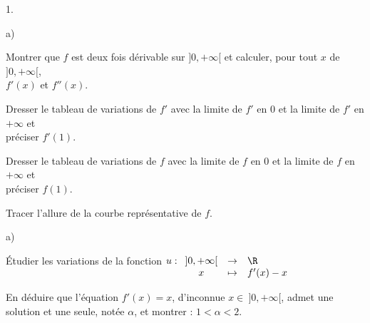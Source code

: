 \begin{noliste}{1.}
  \setlength{\itemsep}{2mm}
\item 
  \begin{noliste}{a)}
  \item Montrer que $f$ est deux fois dérivable sur $]0,+\infty[$ et
    calculer, pour tout $x$ de $]0,+\infty[$,\\
    $f'(x)$ et $f''(x)$.
    
    	
    
  \item Dresser le tableau de variations de $f'$ avec la limite de
    $f'$ en $0$ et la limite de $f'$ en $+\infty$ et \\ préciser
    $f'(1)$.
    
    
  \end{noliste}
  
  
  

\item Dresser le tableau de variations de $f$ avec la limite de $f$ en
  $0$ et la limite de $f$ en $+\infty$ et\\
  préciser $f(1)$.
  
  
  
\item Tracer l'allure de la courbe représentative de $f$.
  
  
    
    
  \item 
    \begin{noliste}{a)}
    \item Étudier les variations de la fonction $u:
    \begin{array}[t]{ccl}
      ]0,+\infty[ & \rightarrow & \R\\
      x & \mapsto & f'(x)-x
    \end{array}$
    
    
    


	
  \item En déduire que l'équation $f'(x)=x$, d'inconnue $x\in \
    ]0,+\infty[$, admet une solution et une seule, notée $\alpha$, et
    montrer : $1<\alpha<2$.
  \end{noliste}      
 
    
\end{noliste}




